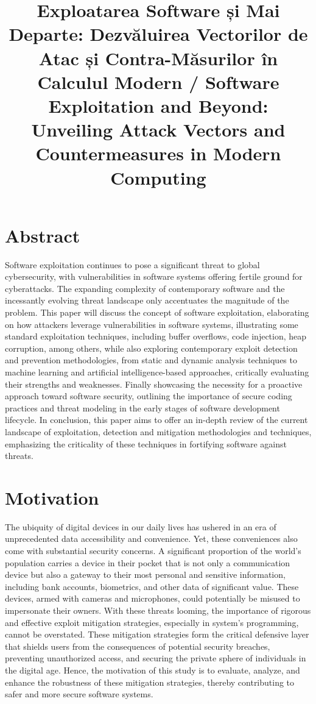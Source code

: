 \documentclass{article}
\begin{document}
\title{Exploatarea Software și Mai Departe: Dezvăluirea Vectorilor de Atac și Contra-Măsurilor în Calculul Modern / Software Exploitation and Beyond: Unveiling Attack Vectors and Countermeasures in Modern Computing}
\maketitle

\tableofcontents

\section{Abstract}%

Software exploitation continues to pose a significant threat to global cybersecurity, with vulnerabilities in software systems offering fertile ground for cyberattacks. The expanding complexity of contemporary software and the incessantly evolving threat landscape only accentuates the magnitude of the problem. This paper will discuss the concept of software exploitation, elaborating on how attackers leverage vulnerabilities in software systems, illustrating some standard exploitation techniques, including buffer overflows, code injection, heap corruption, among others, while also exploring contemporary exploit detection and prevention methodologies, from static and dynamic analysis techniques to machine learning and artificial intelligence-based approaches, critically evaluating their strengths and weaknesses. Finally showcasing the necessity for a proactive approach toward software security, outlining the importance of secure coding practices and threat modeling in the early stages of software development lifecycle. In conclusion, this paper aims to offer an in-depth review of the current landscape of exploitation, detection and mitigation methodologies and techniques, emphasizing the criticality of these techniques in fortifying software against threats.

\section{Motivation}%
The ubiquity of digital devices in our daily lives has ushered in an era of unprecedented data accessibility and convenience. Yet, these conveniences also come with substantial security concerns. A significant proportion of the world's population carries a device in their pocket that is not only a communication device but also a gateway to their most personal and sensitive information, including bank accounts, biometrics, and other data of significant value. These devices, armed with cameras and microphones, could potentially be misused to impersonate their owners. With these threats looming, the importance of rigorous and effective exploit mitigation strategies, especially in system's programming, cannot be overstated. These mitigation strategies form the critical defensive layer that shields users from the consequences of potential security breaches, preventing unauthorized access, and securing the private sphere of individuals in the digital age. Hence, the motivation of this study is to evaluate, analyze, and enhance the robustness of these mitigation strategies, thereby contributing to safer and more secure software systems.
\end{document}
